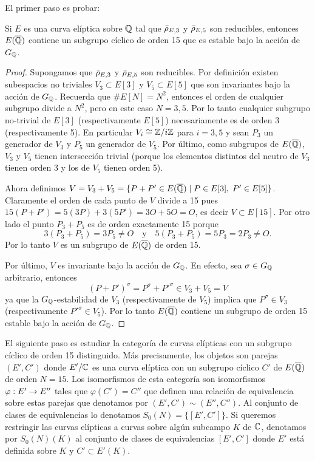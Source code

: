 \documentclass[../../tesis_maestria]{subfiles}
\begin{document}
El primer paso es probar:

\begin{lema}\label{prop:cyclesubgroupE}%
	  Si $E$ es una curva el\'iptica sobre $\mathbb{Q}$ tal que $\bar{\rho}_{E,3}$ y $\bar{\rho}_{E,5}$ son reducibles, entonces $E(\overline{\mathbb{Q}})$ contiene un subgrupo cíclico de orden 15 que es estable bajo la acción de $G_{\mathbb{Q}}$.
\end{lema}

\begin{proof}
  Supongamos que $\bar{\rho}_{E,3}$ y $\bar{\rho}_{E,5}$ son reducibles. Por definici\'on existen subespacios no triviales $V_3\subset E[3]$ y $V_5\subset E[5]$ que son invariantes bajo la acci\'on de $G_{\mathbb{Q}}$. Recuerda que $\# E[N]=N^2$, entonces el orden de cualquier subgrupo divide a $N^2$, pero en este caso $N=3,5$. Por lo tanto cualquier subgrupo no-trivial de $E[3]$ (respectivamente $E[5]$) necesariamente es de orden 3 (respectivamente 5). En particular $V_i\cong \mathbb{Z}/i\mathbb{Z}$ para $i=3,5$ y sean $P_3$ un generador de $V_3$ y $P_5$ un generador de $V_5$. Por \'ultimo, como subgrupos de $E(\overline{\mathbb{Q}})$, $V_3$ y $V_5$ tienen intersecci\'on trivial (porque los elementos distintos del neutro de $V_3$ tienen orden 3 y los de $V_5$ tienen orden 5).
  
  Ahora definimos $V=V_3+V_5=\{P+P'\in E(\overline{\mathbb{Q}}) \mid P\in E[3],\; P'\in E[5]\}$. Claramente el orden de cada punto de $V$ divide a 15 pues $15(P+P')=5(3P)+3(5P')=3O+5O=O$, es decir $V\subset E[15]$. Por otro lado el punto $P_3+P_5$ es de orden exactamente 15 porque
  \[
    3(P_3+P_5)=3P_5\neq O \quad\mathrm{y}\quad 5(P_3+P_5)=5P_3=2P_3\neq O.
  \]
  Por lo tanto $V$ es un subgrupo de $E(\overline{\mathbb{Q}})$ de orden 15.

  Por \'ultimo, $V$ es invariante bajo la acci\'on de $G_{\mathbb{Q}}$. En efecto, sea $\sigma\in G_{\mathbb{Q}}$ arbitrario, entonces
  \[
    (P+P')^{\sigma}=P^{\sigma}+P'^{\sigma}\in V_3+V_5=V
  \]
  ya que la $G_{\mathbb{Q}}$-estabilidad de $V_3$ (respectivamente de $V_5$) implica que $P^{\sigma}\in V_3$ (respectivamente $P'^{\sigma}\in V_5$). Por lo tanto $E(\overline{\mathbb{Q}})$ contiene un subgrupo de orden 15 estable bajo la acci\'on de $G_{\mathbb{Q}}$.
\end{proof}

El siguiente paso es estudiar la categoría de curvas elípticas con un subgrupo cíclico de orden 15 distinguido. Más precisamente, los objetos son parejas $(E',C')$ donde $E'/\mathbb{C}$ es una curva elíptica con un subgrupo cíclico $C'$ de $E(\overline{\mathbb{Q}})$ de orden $N=15$. Los isomorfismos de esta categoría son isomorfismos $\varphi:E'\rightarrow E''$ tales que $\varphi(C')= C''$ que definen una relación de equivalencia sobre estas parejas que denotamos por $(E',C')\sim(E'',C'')$. Al conjunto de clases de equivalencias lo denotamos $S_0(N)=\{[E',C']\}$. Si queremos restringir las curvas elípticas a curvas sobre algún subcampo $K$ de $\mathbb{C}$, denotamos por $S_0(N)(K)$ al conjunto de clases de equivalencias $[E',C']$ donde $E'$ está definida sobre $K$ y $C'\subset E'(K)$.
\end{document}
